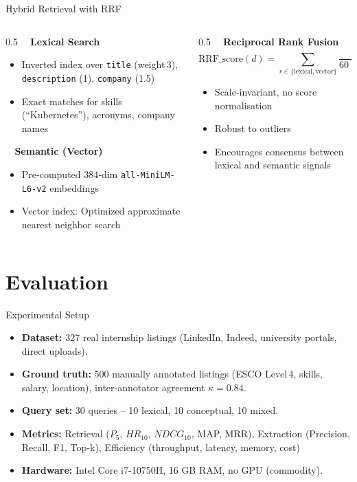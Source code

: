 \documentclass[aspectratio=169, 10pt]{beamer}
\begin{document}
\begin{frame}{Hybrid Retrieval with RRF}
\begin{columns}[T]
\begin{column}{0.5\textwidth}
\textbf{\faKeyboard~ Lexical Search}
\begin{itemize}
\item Inverted index over \texttt{title} (weight 3), \texttt{description} (1), \texttt{company} (1.5)
\item Exact matches for skills (“Kubernetes”), acronyms, company names
\end{itemize}
\vspace{0.3cm}
\textbf{\faBrain~ Semantic (Vector)}
\begin{itemize}
\item Pre‑computed 384‑dim \texttt{all-MiniLM-L6-v2} embeddings
\item Vector index: Optimized approximate nearest neighbor search
\end{itemize}
\end{column}
\begin{column}{0.5\textwidth}
\textbf{\faLink~ Reciprocal Rank Fusion}
\[
\text{RRF\_score}(d) = \sum_{r\in\{\text{lexical},\text{vector}\}} \frac{1}{60 + \text{rank}_r(d)}
\]
\begin{itemize}
\item Scale‑invariant, no score normalisation
\item Robust to outliers
\item Encourages consensus between lexical and semantic signals
\end{itemize}
\end{column}
\end{columns}
\end{frame}

\section{Evaluation}

\begin{frame}{Experimental Setup}
\begin{itemize}
\item \textbf{Dataset:} 327 real internship listings (LinkedIn, Indeed, university portals, direct uploads).
\item \textbf{Ground truth:} 500 manually annotated listings (ESCO Level 4, skills, salary, location), inter‑annotator agreement $\kappa = 0.84$.
\item \textbf{Query set:} 30 queries – 10 lexical, 10 conceptual, 10 mixed.
\item \textbf{Metrics:} Retrieval ($P_5$, $HR_{10}$, $NDCG_{10}$, MAP, MRR), Extraction (Precision, Recall, F1, Top‑k), Efficiency (throughput, latency, memory, cost)
\item \textbf{Hardware:} Intel Core i7-10750H, 16 GB RAM, no GPU (commodity).
\end{itemize}
\end{frame}
\end{document}
